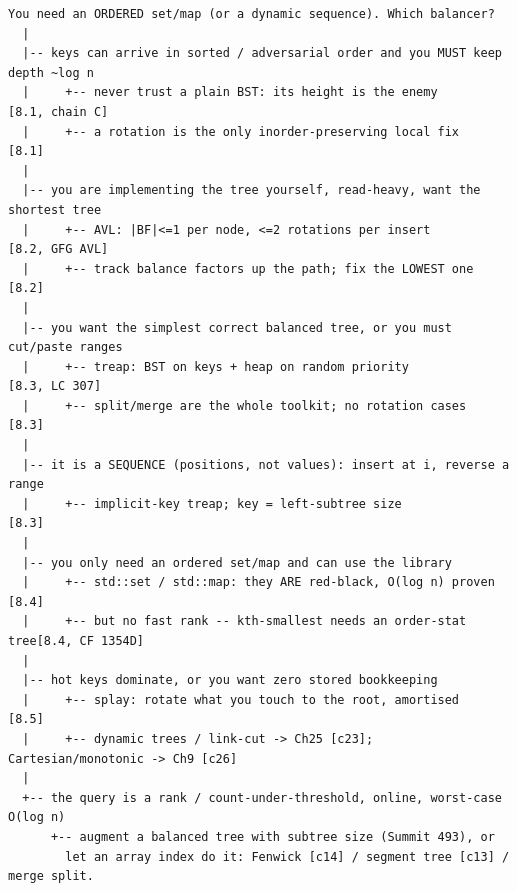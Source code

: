 \begin{lstlisting}[language={}, basicstyle=\ttfamily\small, numbers=none, frame=single]
  You need an ORDERED set/map (or a dynamic sequence). Which balancer?
  |
  |-- keys can arrive in sorted / adversarial order and you MUST keep depth ~log n
  |     +-- never trust a plain BST: its height is the enemy        [8.1, chain C]
  |     +-- a rotation is the only inorder-preserving local fix      [8.1]
  |
  |-- you are implementing the tree yourself, read-heavy, want the shortest tree
  |     +-- AVL: |BF|<=1 per node, <=2 rotations per insert          [8.2, GFG AVL]
  |     +-- track balance factors up the path; fix the LOWEST one    [8.2]
  |
  |-- you want the simplest correct balanced tree, or you must cut/paste ranges
  |     +-- treap: BST on keys + heap on random priority             [8.3, LC 307]
  |     +-- split/merge are the whole toolkit; no rotation cases     [8.3]
  |
  |-- it is a SEQUENCE (positions, not values): insert at i, reverse a range
  |     +-- implicit-key treap; key = left-subtree size              [8.3]
  |
  |-- you only need an ordered set/map and can use the library
  |     +-- std::set / std::map: they ARE red-black, O(log n) proven [8.4]
  |     +-- but no fast rank -- kth-smallest needs an order-stat tree[8.4, CF 1354D]
  |
  |-- hot keys dominate, or you want zero stored bookkeeping
  |     +-- splay: rotate what you touch to the root, amortised      [8.5]
  |     +-- dynamic trees / link-cut -> Ch25 [c23]; Cartesian/monotonic -> Ch9 [c26]
  |
  +-- the query is a rank / count-under-threshold, online, worst-case O(log n)
      +-- augment a balanced tree with subtree size (Summit 493), or
        let an array index do it: Fenwick [c14] / segment tree [c13] / merge split.
\end{lstlisting}


